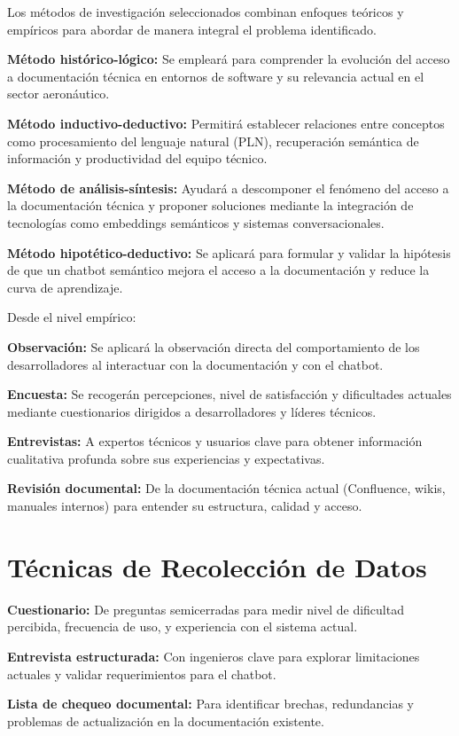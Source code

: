 Los métodos de investigación seleccionados combinan enfoques teóricos y empíricos para abordar de manera integral el problema identificado.

\textbf{Método histórico-lógico:} Se empleará para comprender la evolución del acceso a documentación técnica en entornos de software y su relevancia actual en el sector aeronáutico.

\textbf{Método inductivo-deductivo:} Permitirá establecer relaciones entre conceptos como procesamiento del lenguaje natural (PLN), recuperación semántica de información y productividad del equipo técnico.

\textbf{Método de análisis-síntesis:} Ayudará a descomponer el fenómeno del acceso a la documentación técnica y proponer soluciones mediante la integración de tecnologías como embeddings semánticos y sistemas conversacionales.

\textbf{Método hipotético-deductivo:} Se aplicará para formular y validar la hipótesis de que un chatbot semántico mejora el acceso a la documentación y reduce la curva de aprendizaje.

Desde el nivel empírico:

\textbf{Observación:} Se aplicará la observación directa del comportamiento de los desarrolladores al interactuar con la documentación y con el chatbot.

\textbf{Encuesta:} Se recogerán percepciones, nivel de satisfacción y dificultades actuales mediante cuestionarios dirigidos a desarrolladores y líderes técnicos.

\textbf{Entrevistas:} A expertos técnicos y usuarios clave para obtener información cualitativa profunda sobre sus experiencias y expectativas.

\textbf{Revisión documental:} De la documentación técnica actual (Confluence, wikis, manuales internos) para entender su estructura, calidad y acceso.


\section{Técnicas de Recolección de Datos}

\textbf{Cuestionario:} De preguntas semicerradas para medir nivel de dificultad percibida, frecuencia de uso, y experiencia con el sistema actual.

\textbf{Entrevista estructurada:} Con ingenieros clave para explorar limitaciones actuales y validar requerimientos para el chatbot.

\textbf{Lista de chequeo documental:} Para identificar brechas, redundancias y problemas de actualización en la documentación existente.

